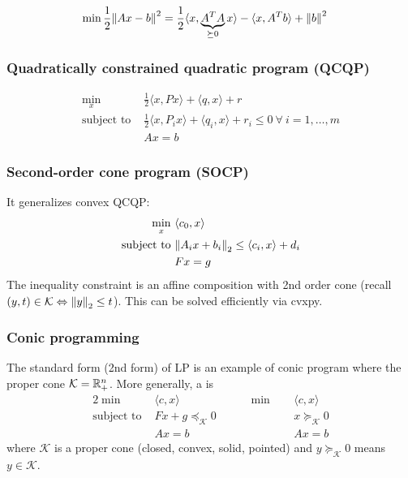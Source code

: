 \documentclass[class=article,crop=false]{standalone}
\begin{document}
\begin{eg}[Regression]
 \begin{align*}
	\min \frac{1}{2} {\left\lVert{ Ax-b}\right\rVert}^2 &= \frac{1}{2} \langle x,\underbrace{ A^{T}A}_{ \succeq 0} x \rangle - \langle x, A^{T}b \rangle + {\left\lVert{ b}\right\rVert}^2
\end{align*}
\end{eg}
\subsubsection{Quadratically constrained quadratic program (QCQP)}
\begin{align*}
\min_x\ & \frac{1}{2} \langle x,Px \rangle + \langle q,x \rangle + r \\
\text{subject to } &\frac{1}{2} \langle x,P_i x \rangle + \langle q_i,x \rangle + r_i  \leq 0 \ \forall \ i=1,\ldots,m\\
&Ax = b
\end{align*}
\subsubsection{Second-order cone program (SOCP)}
It generalizes convex QCQP:
\begin{align*}
\min_x\ & \langle c_0,x \rangle \\
\text{subject to } &{\left\lVert{ A_i x+b_i}\right\rVert}_2 \leq \langle c_i,x \rangle+ d_i\\
&Fx = g
\end{align*}
The inequality constraint is an affine composition with 2nd order cone (recall $ (y,t) \in \mathcal{ K} \Leftrightarrow {\left\lVert{ y}\right\rVert}_2 \leq t$). This can be solved efficiently via cvxpy.
\subsubsection{Conic programming}
The standard form (2nd form) of LP is an example of conic program where the proper cone $ \mathcal{ K} = \mathbb{R}_{+}^{n}$. More generally, a  is
\begin{alignat*}{2}
	\min\ & \langle c,x \rangle \qquad\qquad \qquad   \min\ &&\langle c,x \rangle \\
	\text{subject to } &Fx +g \preceq_{ \mathcal{ K}} 0 &&x \succeq_{ \mathcal{ K}} 0 \\
			   &Ax = b &&Ax=b
\end{alignat*}	
where $ \mathcal{ K}$ is a proper cone (closed, convex, solid, pointed) and $ y \succeq _{ \mathcal{ K}}0$ means $ y \in \mathcal{ K}$.
\end{document}
